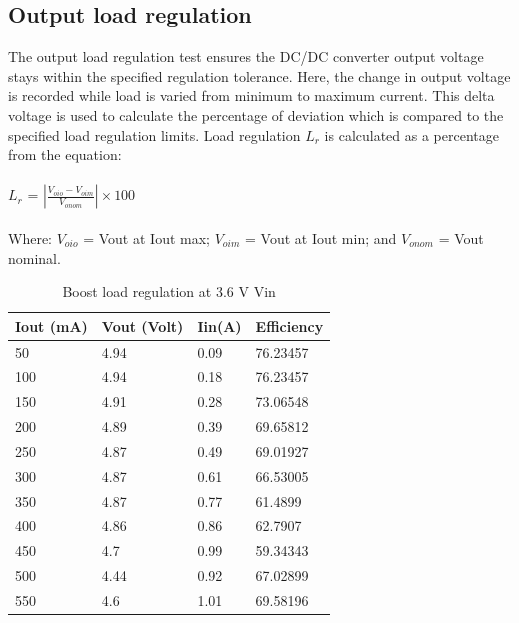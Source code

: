 \subsection{Output load regulation} 
The output load regulation test ensures the DC/DC converter output voltage stays within the specified regulation tolerance. Here, the change in output voltage is recorded while load is varied from minimum to maximum current. This delta voltage is used to calculate the percentage of deviation which is compared to the specified load regulation limits. Load regulation $L_{r}$ is calculated as a percentage from the equation:
\\ \\
\hspace*{5cm}$L_{r}$ = $\left | \frac{V_{oio}-V_{oim}}{V_{onom}} \right | \times 100$
\\ \\
Where:
$V_{oio}$ = Vout at Iout max; 
$V_{oim}$ = Vout at Iout min; and
$V_{onom}$ = Vout nominal.
\pagebreak
\begin{table}[H]
\centering
\begin{tabular}{|l|l|l|l|}
\hline
Iout (mA) & Vout (Volt) & Iin(A) & Efficiency \\ \hline
50        & 4.94        & 0.09   & 76.23457   \\ \hline
100       & 4.94        & 0.18   & 76.23457   \\ \hline
150       & 4.91        & 0.28   & 73.06548   \\ \hline
200       & 4.89        & 0.39   & 69.65812   \\ \hline
250       & 4.87        & 0.49   & 69.01927   \\ \hline
300       & 4.87        & 0.61   & 66.53005   \\ \hline
350       & 4.87        & 0.77   & 61.4899    \\ \hline
400       & 4.86        & 0.86   & 62.7907    \\ \hline
450       & 4.7         & 0.99   & 59.34343   \\ \hline
500       & 4.44        & 0.92   & 67.02899   \\ \hline
550       & 4.6         & 1.01   & 69.58196   \\ \hline
\end{tabular}
\caption{Boost load regulation at 3.6 V Vin}
\label{table:4}
\end{table}
\\
